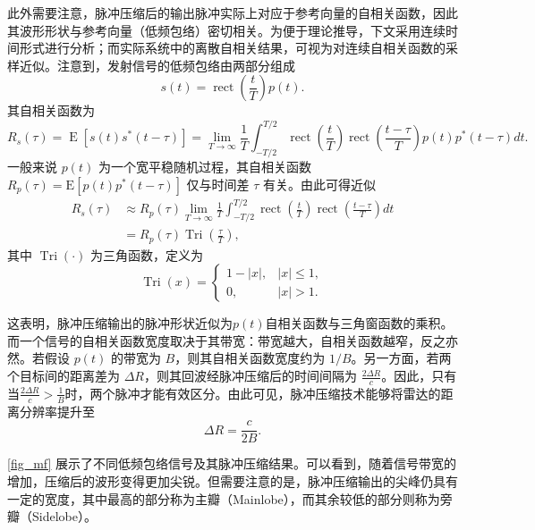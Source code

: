 此外需要注意，脉冲压缩后的输出脉冲实际上对应于参考向量的自相关函数，因此其波形形状与参考向量（低频包络）密切相关。为便于理论推导，下文采用连续时间形式进行分析；而实际系统中的离散自相关结果，可视为对连续自相关函数的采样近似。注意到，发射信号的低频包络由两部分组成
\[
    s(t) = \operatorname{rect}\left( \frac{t}{T} \right) p(t).
\]
其自相关函数为
\[
    R_s(\tau) = \operatorname{E}\left[ s(t)s^*(t-\tau)\right]
    = \lim_{T \rightarrow \infty } \frac{1}{T} \int_{-T/2}^{T/2} \operatorname{rect}\left( \frac{t}{T} \right)
    \operatorname{rect}\left( \frac{t-\tau}{T} \right)
    p(t)p^*(t-\tau)dt.
\]
一般来说 \(p(t)\) 为一个宽平稳随机过程，其自相关函数\( R_p(\tau) = \mathrm{E}[p(t)p^*(t-\tau)] \) 仅与时间差 \(\tau\) 有关。由此可得近似
\[
    \begin{split}
        R_s(\tau) & \approx R_p(\tau)
        \lim_{T \rightarrow \infty } \frac{1}{T} \int_{-T/2}^{T/2}
        \operatorname{rect}\left( \frac{t}{T} \right)
        \operatorname{rect}\left( \frac{t-\tau}{T} \right) dt                    \\
                  & = R_p(\tau) \operatorname{Tri}\left( \frac{\tau}{T} \right),
    \end{split}
\]
其中 \(\operatorname{Tri}(\cdot)\) 为三角函数，定义为
\[
    \operatorname{Tri}(x) =
    \begin{cases}
        1-|x|, & |x|\leq 1, \\
        0,     & |x|>1.
    \end{cases}
\]

这表明，脉冲压缩输出的脉冲形状近似为\( p(t) \)自相关函数与三角窗函数的乘积。而一个信号的自相关函数宽度取决于其带宽：带宽越大，自相关函数越窄，反之亦然。若假设 \(p(t)\) 的带宽为 \(B\)，则其自相关函数宽度约为 \(1/B\)。另一方面，若两个目标间的距离差为 \(\Delta R\)，则其回波经脉冲压缩后的时间间隔为 \(\frac{2\Delta R}{c}\)。因此，只有当\(\frac{2\Delta R}{c} > \frac{1}{B}\)时，两个脉冲才能有效区分。由此可见，脉冲压缩技术能够将雷达的距离分辨率提升至
\[
    \Delta R = \frac{c}{2B}.
\]

\cref{fig_mf} 展示了不同低频包络信号及其脉冲压缩结果。可以看到，随着信号带宽的增加，压缩后的波形变得更加尖锐。但需要注意的是，脉冲压缩输出的尖峰仍具有一定的宽度，其中最高的部分称为主瓣（Mainlobe），而其余较低的部分则称为旁瓣（Sidelobe）。

